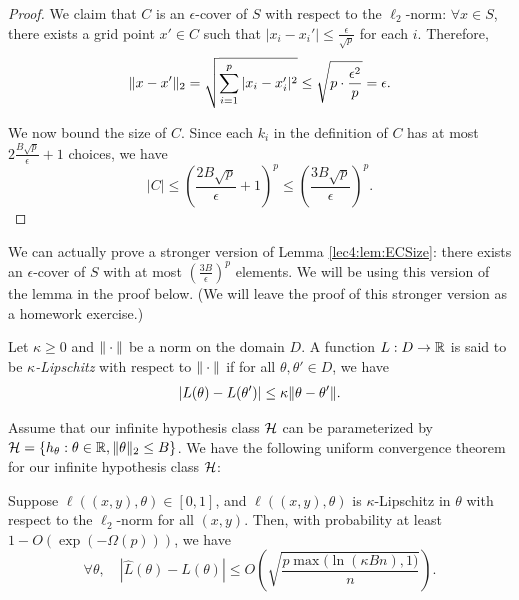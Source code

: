 \begin{proof}
We claim that $C$ is an $\epsilon$-cover of $S$ with respect to the $\ell_2$-norm: $\forall x \in S$, there exists a grid point $x' \in C$ such that $|x_i-x_i'| \le \tfrac{\epsilon}{\sqrt{p}}$ for each $i$. Therefore,
$$\|x-x'\|_2 = \sqrt{\sum_{i = 1}^p |x_i - x_i'|^2} \leq \sqrt{p\cdot \frac{\epsilon^2}{p}} = \epsilon.$$

We now bound the size of $C$. Since each $k_i$ in the definition of $C$ has at most $2\tfrac{B\sqrt{p}}{\epsilon}+1$ choices, we have 
\begin{equation}
|C| \le \left( \frac{2B\sqrt{p}}{\epsilon} +1\right)^p \le \left(\frac{3B\sqrt{p}}{\epsilon}\right)^p.
\end{equation}
\end{proof}

\begin{remark}\label{lec4:rem:enet}
We can actually prove a stronger version of Lemma \ref{lec4:lem:ECSize}: there exists an $\epsilon$-cover of $S$ with at most $\left(\frac{3B}{\epsilon}\right)^p$ elements. We will be using this version of the lemma in the proof below. (We will leave the proof of this stronger version as a homework exercise.)
\end{remark}


\begin{definition}
Let $\kappa \ge 0$ and $\|\cdot\|$ be a norm on the domain $D$. A function $L:D \to \mathbb R$ is said to be \emph{$\kappa$-Lipschitz} with respect to $\|\cdot\|$ if for all $\theta, \theta' \in D$, we have
$$
    |L(\theta)-L(\theta')| \le \kappa \|\theta-\theta'\|.
$$
\end{definition}

Assume that our infinite hypothesis class $\mathcal H$ can be parameterized by $\mathcal H = \{h_{\theta} : \theta \in \mathbb{R}, \Vert \theta \Vert_2 \leq B\}$. We have the following uniform convergence theorem for our infinite hypothesis class $\mathcal H$:

\begin{theorem}\label{lec4:thm:main}
Suppose $\ell((x,y), \theta) \in [0,1]$, and $\ell((x,y), \theta)$ is $\kappa$-Lipschitz in $\theta$ with respect to the $\ell_2$-norm for all $(x, y)$. Then, with probability  at least $1-O(\exp(-\Omega(p)))$, we have
\begin{equation}
    \forall \theta, \quad |\hat L(\theta)- L(\theta)| \leq  O\left(\sqrt{\frac{p \max(\ln{(\kappa Bn), 1)}}{n}}\right).
\end{equation}
\end{theorem}

